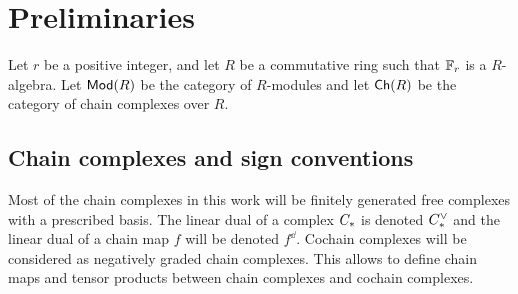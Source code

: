 
\section{Preliminaries}\label{s:preliminaries}


Let $r$ be a positive integer, and let $R$ be a commutative ring such that $\mathbb{F}_r$ is a $R$-algebra. Let $\mathsf{Mod}(R)$ be the category of $R$-modules and let $\mathsf{Ch}(R)$ be the category of chain complexes over $R$.

\subsection{Chain complexes and sign conventions} Most of the chain complexes in this work will be finitely generated free complexes with a prescribed basis. The linear dual of a complex $C_{*}$ is denoted $C^\vee_{*}$ and the linear dual of a chain map $f$ will be denoted $f^\dd$. Cochain complexes will be considered as negatively graded chain complexes. This allows to define chain maps and tensor products between chain complexes and cochain complexes.

